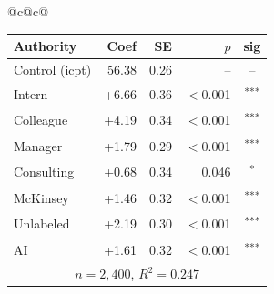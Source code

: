\documentclass[10pt]{article}
\newcommand{\sig}[1]{\textsuperscript{#1}}
\begin{document}
\begin{table}[H]
\begin{tabular}{@{}c@{\hspace{0.5em}}c@{}}
\begin{minipage}[t]{0.49\textwidth}
\begin{tabular}{@{}l r r r c@{}}
\toprule
Authority & Coef & SE & $p$ & sig \\
\midrule
\cellcolor{gray!22}Control (icpt) & \cellcolor{gray!22}56.38 & \cellcolor{gray!22}0.26 & \cellcolor{gray!22}-- & \cellcolor{gray!22}-- \\
\midrule
Intern & +6.66 & 0.36 & $<$0.001 & \sig{***} \\
Colleague & +4.19 & 0.34 & $<$0.001 & \sig{***} \\
Manager & +1.79 & 0.29 & $<$0.001 & \sig{***} \\
\midrule
Consulting & +0.68 & 0.34 & 0.046 & \sig{*} \\
McKinsey & +1.46 & 0.32 & $<$0.001 & \sig{***} \\
\midrule
Unlabeled & +2.19 & 0.30 & $<$0.001 & \sig{***} \\
AI & +1.61 & 0.32 & $<$0.001 & \sig{***} \\
\midrule
\multicolumn{5}{c}{\scriptsize $n=2{,}400$, $R^2=0.247$} \\
\bottomrule\end{tabular}
\end{minipage} \\
\end{tabular}
\end{table}
\end{document}

